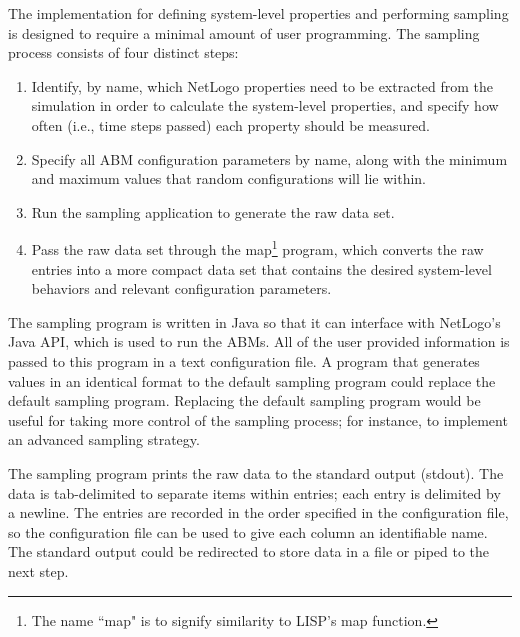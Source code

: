 The \fw implementation for defining system-level properties and performing sampling is designed to require a minimal amount of user programming.
The sampling process consists of four distinct steps:
\begin{enumerate}
\item Identify, by name, which NetLogo properties need to be extracted from the simulation in order to calculate the system-level properties, and specify how often (i.e., time steps passed) each property should be measured.
\item Specify all ABM configuration parameters by name, along with the minimum and maximum values that random configurations will lie within.
\item Run the sampling application to generate the raw data set.
\item Pass the raw data set through the map\footnote{The name ``map" is to signify similarity to LISP's map function.} program, which converts the raw entries into a more compact data set that contains the desired system-level behaviors and relevant configuration parameters.
\end{enumerate}

The sampling program is written in Java so that it can interface with NetLogo's Java API, which is used to run the ABMs.
All of the user provided information is passed to this program in a text configuration file.
A program that generates values in an identical format to the default sampling program could replace the default sampling program.
Replacing the default sampling program would be useful for taking more control of the sampling process; for instance, to implement an advanced sampling strategy.

The sampling program prints the raw data to the standard output (stdout).
The data is tab-delimited to separate items within entries; each entry is delimited by a newline.
The entries are recorded in the order specified in the configuration file, so the configuration file can be used to give each column an identifiable name.
The standard output could be redirected to store data in a file or piped to the next step.


